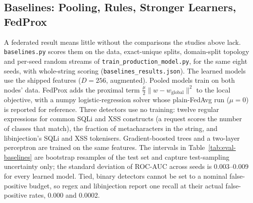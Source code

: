 \subsection{Baselines: Pooling, Rules, Stronger Learners, FedProx}
\label{sec:eval-baselines}

A federated result means little without the comparisons the studies above lack. \texttt{baselines.py} scores them on the data, exact-unique splits, domain-split topology and per-seed random streams of \texttt{train\_production\_model.py}, for the same eight seeds, with whole-string scoring (\texttt{baselines\_results.json}). The learned models use the shipped features ($D=256$, augmented). Pooled models train on both nodes' data. FedProx adds the proximal term $\tfrac{\mu}{2}\lVert w-w_{\text{global}}\rVert^2$ to the local objective, with a numpy logistic-regression solver whose plain-FedAvg run ($\mu=0$) is reported for reference. Three detectors use no training: twelve regular expressions for common SQLi and XSS constructs (a request scores the number of classes that match), the fraction of metacharacters in the string, and libinjection's SQLi and XSS tokenisers. Gradient-boosted trees and a two-layer perceptron are trained on the same features. The intervals in Table~\ref{tab:eval-baselines} are bootstrap resamples of the test set and capture test-sampling uncertainty only; the standard deviation of ROC-AUC across seeds is 0.003--0.009 for every learned model. Tied, binary detectors cannot be set to a nominal false-positive budget, so regex and libinjection report one recall at their actual false-positive rates, 0.000 and 0.0002.

